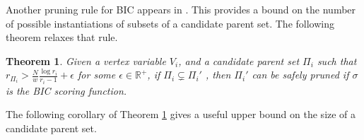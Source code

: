 \documentclass[letterpaper]{article}
\newcommand{\vertex}[1]{V_{#1}}
\newcommand{\parents}{\Pi}
\newtheorem{theorem}{Theorem}
\newtheorem{corollary}{Corollary}
\begin{document}
Another pruning rule for BIC appears in \cite{CamposJ11}. This provides a bound on the number of possible instantiations of subsets of a candidate parent set. The following theorem relaxes that rule.


	

\begin{theorem}
	Given a vertex variable $V_i$, and a candidate parent set $\Pi_i$ such that $r_{\Pi_i}> \frac{N}{w} \frac{\log r_i}{r_i -1} + \epsilon$ for some $\epsilon \in \mathbb{R}^+$,  if $\parents_i \subsetneq \parents_i'$ , then $\parents_i'$ can be safely pruned if $\sigma$ is the BIC scoring function. \label{THEOREM:decamposbicrelaxed}
\end{theorem}

The following corollary of Theorem \ref{THEOREM:decamposbicrelaxed} gives a useful upper bound on the size of a candidate parent set.

\end{document}
